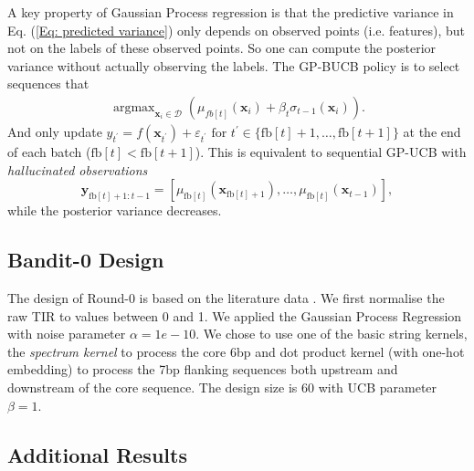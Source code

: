 \documentclass{scrartcl}[2013/05/29]%
\newcommand{\mengyan}[1]{\textcolor{magenta}{#1}}
\begin{document}
A key property of Gaussian Process regression is that the predictive variance in Eq. (\ref{Eq: predicted variance}) only depends on observed points (i.e. features), but not on the labels of these observed points. 
So one can compute the posterior variance without actually observing the labels. 
The GP-BUCB policy is to select sequences that
\begin{align}
    \operatorname{argmax}_{\mathbf{x}_i \in \mathcal{D}} \left( \mu_{fb[t]}(\mathbf{x}_i) + \beta_t \sigma_{t-1}(\mathbf{x}_i)\right).
\end{align}
And only update $y_{t^{\prime}}=f\left(\boldsymbol{x}_{t^{\prime}}\right)+\varepsilon_{t^{\prime}} \text { for } t^{\prime} \in\{\mathrm{fb}[t]+1, \ldots, \mathrm{fb}[t+1]\}$ at the end of each batch ($\mathrm{fb}[t]<\mathrm{fb}[t+1]$). 
This is equivalent to sequential GP-UCB with \textit{hallucinated observations} $$\boldsymbol{y}_{\mathrm{fb}[t]+1: t-1}=\left[\mu_{\mathrm{fb}[t]}\left(\boldsymbol{x}_{\mathrm{fb}[t]+1}\right), \ldots, \mu_{\mathrm{fb}[t]}\left(\boldsymbol{x}_{t-1}\right)\right],$$
while the posterior variance decreases. 

\subsection{Bandit-0 Design}
\label{sec: ML design pipeline}

The design of Round-0 is based on the literature data \cite{jervis2018machine}.
We first normalise the raw TIR to values between 0 and 1. 
We applied the Gaussian Process Regression with noise parameter $\alpha = 1e-10$. 
We chose to use one of the basic string kernels, the \textit{spectrum kernel} \cite{leslie2001spectrum} to process the core 6bp and dot product kernel \cite{Rasmussen2004} (with one-hot embedding) to process the 7bp flanking sequences both upstream and downstream of the core sequence.
The design size is 60 with UCB parameter $\beta = 1$.

\subsection{Additional Results}
\end{document}
